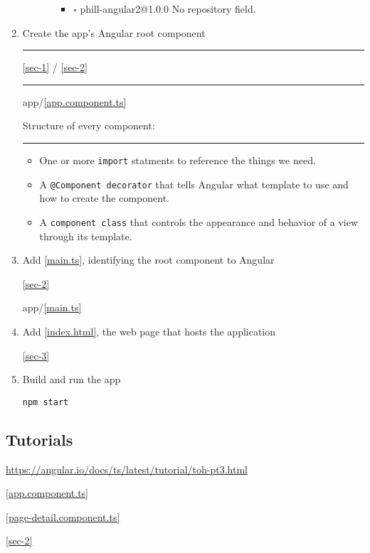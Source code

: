 \documentclass[11pt]{article}
\begin{document}
\begin{enumerate}
\begin{enumerate}
\begin{itemize}
\begin{itemize}
\item $\square$ phill-angular2@1.0.0 No repository field.
\end{itemize}
\end{itemize}
\end{enumerate}

\item Create the app's Angular root component

\rule{\linewidth}{0.5pt}

\ref{sec-1} / \ref{sec-2}

\rule{\linewidth}{0.5pt}
app/\ref{app.component.ts}

Structure of every component:

\rule{\linewidth}{0.5pt}

\begin{itemize}
\item One or more \texttt{import} statments to reference the things we need.
\item A \texttt{@Component decorator} that tells Angular what template to use and how to
create the component.
\item A \texttt{component class} that controls the appearance and behavior of a view 
through its template.
\end{itemize}

\item Add \ref{main.ts}, identifying the root component to Angular

\ref{sec-2}

app/\ref{main.ts}

\item Add \ref{index.html}, the web page that hosts the application

\ref{sec-3}

\item Build and run the app

\begin{verbatim}
npm start
\end{verbatim}
\end{enumerate}

\subsection{Tutorials}
\label{sec-5-4}

\url{https://angular.io/docs/ts/latest/tutorial/toh-pt3.html}

\ref{app.component.ts}

\ref{page-detail.component.ts}

\ref{sec-2}
\end{document}
